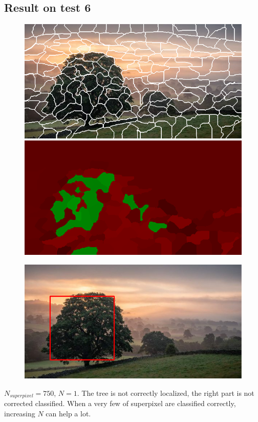 \documentclass[a4paper,titlepaget]{article}
\begin{document}
\subsection{Result on test 6}
\begin{figure}[htpb] 
	\centering
	\begin{minipage}{.3\textwidth}
		\includegraphics[width=1.7\textwidth]{images/results/6seg} 
	\end{minipage}
	\hspace{.25\textwidth}
	\begin{minipage}{.3\textwidth}
		\includegraphics[width=1.7\textwidth]{images/results/6map}
	\end{minipage}  
\end{figure}
\begin{figure}[htpb]
	\centering
	\includegraphics[width=.9\textwidth]{images/results/6fin}
\end{figure}
$N_{superpixel}=750$, $N=1$. The tree is not correctly localized, the right part is not corrected classified. When a very few of superpixel are classified correctly, increasing $N$ can help a lot.
\newpage
\end{document}
